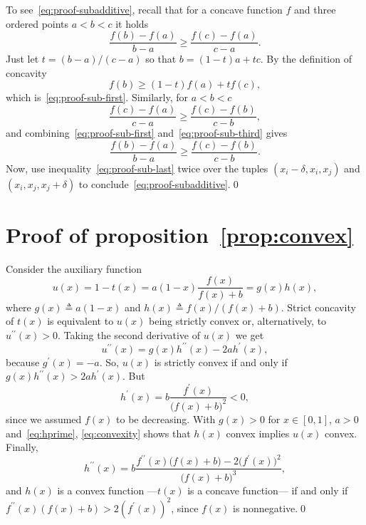 \documentclass[journal,english,twocolumn,10pt,letterpaper]{IEEEtran}
\begin{document}
To see~\eqref{eq:proof-subadditive}, recall that for a concave function $f$
and three ordered points $a<b<c$ it holds
\begin{equation}
  \label{eq:proof-sub-first}
  \frac{f(b)-f(a)}{b-a} \ge \frac{f(c)-f(a)}{c-a}.
\end{equation}
Just let $t=(b-a)/(c-a)$ so that $b=(1-t)a+tc$.
By the definition of concavity
\begin{equation}
  \label{eq:proof-sub-second}
  f(b)\ge(1-t)f(a)+tf(c),
\end{equation}
which is~\eqref{eq:proof-sub-first}. Similarly, for $a<b<c$
\begin{equation}
  \label{eq:proof-sub-third}
  \frac{f(c)-f(a)}{c-a}\ge\frac{f(c)-f(b)}{c-b},
\end{equation}
and combining~\eqref{eq:proof-sub-first} and~\eqref{eq:proof-sub-third} gives
\begin{equation}
  \label{eq:proof-sub-last}
  \frac{f(b)-f(a)}{b-a}\ge\frac{f(c)-f(b)}{c-b}.
\end{equation}
Now, use inequality~\eqref{eq:proof-sub-last} twice over the tuples
$(x_i-\delta, x_i, x_j)$ and $(x_i, x_j, x_j+\delta)$ to
conclude~\eqref{eq:proof-subadditive}.\qed

\section{Proof of proposition~\ref{prop:convex}}
\label{sec:proof-proposition-convex}

Consider the auxiliary function
\begin{equation}
  u(x) = 1 - t(x) = a(1 - x)\frac{f(x)}{f(x) + b} = g(x) h(x),
\end{equation}
where $g(x) \triangleq a (1 - x)$ and $h(x) \triangleq f(x) / (f(x) + b)$.
Strict concavity of $t(x)$ is equivalent to $u(x)$ being strictly convex or,
alternatively, to $u^{\prime\prime}(x) > 0$. Taking the second derivative of
$u(x)$ we get
\begin{equation}
  \label{eq:convexity}
  u^{\prime\prime}(x) = g(x) h^{\prime\prime}(x) - 2 a h^\prime(x),
\end{equation}
because $g^\prime(x) = -a$. So, $u(x)$ is strictly convex if and only if $g(x)
h^{\prime\prime}(x) > 2 a h^\prime(x)$. But
\begin{equation}
  \label{eq:hprime}
  h^\prime(x) = b \frac{f^\prime(x)}{\bigl( f(x) + b \bigr)^2} < 0,
\end{equation}
since we assumed $f(x)$ to be decreasing. With $g(x) > 0$ for $x \in [0, 1]$,
$a > 0$ and~\eqref{eq:hprime}, \eqref{eq:convexity} shows that $h(x)$ convex
implies $u(x)$ convex. Finally,
\begin{equation}
  h^{\prime\prime}(x) = b \frac{f^{\prime\prime}(x) \bigl( f(x) + b \bigr) -
    2 \bigl( f^\prime(x) \bigr)^2}{\bigl( f(x) + b \bigr)^3},
\end{equation}
and $h(x)$ is a convex function ---$t(x)$ is a concave function--- if and only
if $f^{\prime\prime}(x) (f(x) + b) > 2 (f^\prime(x))^2$, since $f(x)$ is
nonnegative.\qed


\balance


\end{document}
